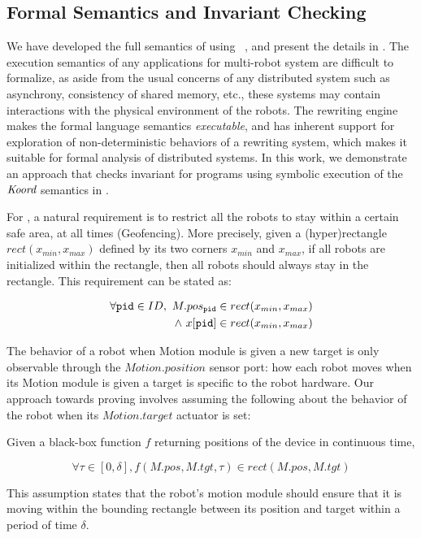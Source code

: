 \subsection{Formal Semantics and Invariant Checking}

We have developed the full semantics of \lgname using \K~\cite{rosu-serbanuta-2013-k}, and present the details in . The execution semantics of any applications for multi-robot system are difficult to formalize, as aside from the usual concerns of any distributed system such as asynchrony, consistency of shared memory, etc., these systems may contain interactions with the physical environment of the robots.
The \K rewriting engine makes the formal language semantics \emph{executable}, and has inherent support for exploration of non-deterministic behaviors of a rewriting system, which makes it suitable for formal analysis of distributed systems.
In this work, we demonstrate an approach that checks invariant for \lgname programs using symbolic execution of the $\emph{Koord}$ semantics in \K.

For \LineForm, a natural requirement is to restrict all the robots to stay within a certain safe area, at all times (Geofencing).
More precisely, given a (hyper)rectangle $rect(x_{min}, x_{max})$ defined by its two corners $x_{min}$ and $x_{max}$,
if all robots are initialized within the rectangle, then all robots should always stay in the rectangle. This requirement can be stated as:
\begin{invariant}\label{inv:lineform}
\[
\begin{split}
    \forall \texttt{pid} \in ID,\ M.pos_{\texttt{pid}} \in rect(x_{min}, x_{max}) \\
    \land\ x[\texttt{pid}] \in rect(x_{min}, x_{max})
\end{split}
\]
\end{invariant}
The behavior of a robot when Motion module is given a new target is only observable through the $Motion.position$ sensor port: how each robot moves when its Motion module is given a target is specific to the robot hardware. Our approach towards proving  involves assuming the following about the behavior of the robot when its $Motion.target$ actuator is set:

Given a black-box function $f$ returning positions of the device in continuous time,
\begin{assumption}\label{lineform-assume}
\[
\forall \tau \in [0, \delta], f(M.pos, M.tgt, \tau) \in rect(M.pos, M.tgt)
\]
\end{assumption}
This assumption states that the robot's motion module should ensure that it is moving within the bounding rectangle between its position and target
within a period of time $\delta$.

